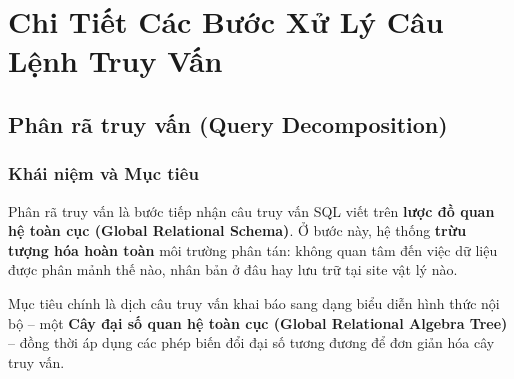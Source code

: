 \documentclass[12pt,a4paper]{report}
\begin{document}
\section{Chi Tiết Các Bước Xử Lý Câu Lệnh Truy Vấn}

\subsection{Phân rã truy vấn (Query Decomposition)}
\subsubsection{Khái niệm và Mục tiêu}
Phân rã truy vấn là bước tiếp nhận câu truy vấn SQL viết trên \textbf{lược đồ quan hệ toàn cục (Global Relational Schema)}. Ở bước này, hệ thống \textbf{trừu tượng hóa hoàn toàn} môi trường phân tán: không quan tâm đến việc dữ liệu được phân mảnh thế nào, nhân bản ở đâu hay lưu trữ tại site vật lý nào.

Mục tiêu chính là dịch câu truy vấn khai báo sang dạng biểu diễn hình thức nội bộ -- một \textbf{Cây đại số quan hệ toàn cục (Global Relational Algebra Tree)} -- đồng thời áp dụng các phép biến đổi đại số tương đương để đơn giản hóa cây truy vấn.
\end{document}
